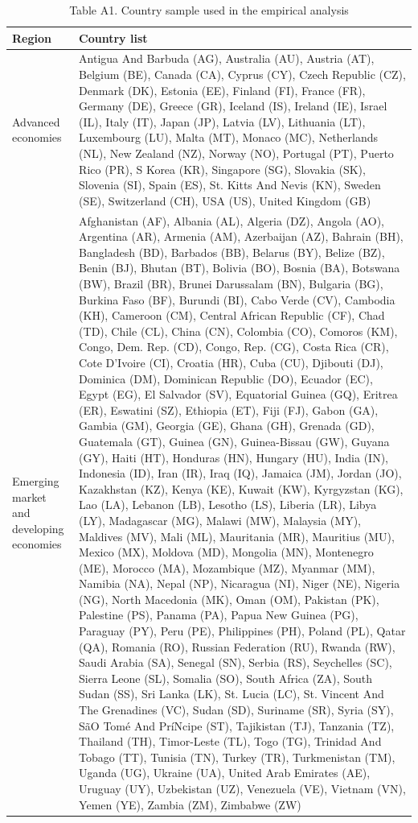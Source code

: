 \begin{table}[htbp]
\centering
\caption{Table A1. Country sample used in the empirical analysis}
\small
\begin{tabular}{p{}p{}}
\hline
Region & Country list \\
\hline
Advanced economies & Antigua And Barbuda (AG), Australia (AU), Austria (AT), Belgium (BE), Canada (CA), Cyprus (CY), Czech Republic (CZ), Denmark (DK), Estonia (EE), Finland (FI), France (FR), Germany (DE), Greece (GR), Iceland (IS), Ireland (IE), Israel (IL), Italy (IT), Japan (JP), Latvia (LV), Lithuania (LT), Luxembourg (LU), Malta (MT), Monaco (MC), Netherlands (NL), New Zealand (NZ), Norway (NO), Portugal (PT), Puerto Rico (PR), S Korea (KR), Singapore (SG), Slovakia (SK), Slovenia (SI), Spain (ES), St. Kitts And Nevis (KN), Sweden (SE), Switzerland (CH), USA (US), United Kingdom (GB) \\
Emerging market and developing economies & Afghanistan (AF), Albania (AL), Algeria (DZ), Angola (AO), Argentina (AR), Armenia (AM), Azerbaijan (AZ), Bahrain (BH), Bangladesh (BD), Barbados (BB), Belarus (BY), Belize (BZ), Benin (BJ), Bhutan (BT), Bolivia (BO), Bosnia (BA), Botswana (BW), Brazil (BR), Brunei Darussalam (BN), Bulgaria (BG), Burkina Faso (BF), Burundi (BI), Cabo Verde (CV), Cambodia (KH), Cameroon (CM), Central African Republic (CF), Chad (TD), Chile (CL), China (CN), Colombia (CO), Comoros (KM), Congo, Dem. Rep. (CD), Congo, Rep. (CG), Costa Rica (CR), Cote D'Ivoire (CI), Croatia (HR), Cuba (CU), Djibouti (DJ), Dominica (DM), Dominican Republic (DO), Ecuador (EC), Egypt (EG), El Salvador (SV), Equatorial Guinea (GQ), Eritrea (ER), Eswatini (SZ), Ethiopia (ET), Fiji (FJ), Gabon (GA), Gambia (GM), Georgia (GE), Ghana (GH), Grenada (GD), Guatemala (GT), Guinea (GN), Guinea-Bissau (GW), Guyana (GY), Haiti (HT), Honduras (HN), Hungary (HU), India (IN), Indonesia (ID), Iran (IR), Iraq (IQ), Jamaica (JM), Jordan (JO), Kazakhstan (KZ), Kenya (KE), Kuwait (KW), Kyrgyzstan (KG), Lao (LA), Lebanon (LB), Lesotho (LS), Liberia (LR), Libya (LY), Madagascar (MG), Malawi (MW), Malaysia (MY), Maldives (MV), Mali (ML), Mauritania (MR), Mauritius (MU), Mexico (MX), Moldova (MD), Mongolia (MN), Montenegro (ME), Morocco (MA), Mozambique (MZ), Myanmar (MM), Namibia (NA), Nepal (NP), Nicaragua (NI), Niger (NE), Nigeria (NG), North Macedonia (MK), Oman (OM), Pakistan (PK), Palestine (PS), Panama (PA), Papua New Guinea (PG), Paraguay (PY), Peru (PE), Philippines (PH), Poland (PL), Qatar (QA), Romania (RO), Russian Federation (RU), Rwanda (RW), Saudi Arabia (SA), Senegal (SN), Serbia (RS), Seychelles (SC), Sierra Leone (SL), Somalia (SO), South Africa (ZA), South Sudan (SS), Sri Lanka (LK), St. Lucia (LC), St. Vincent And The Grenadines (VC), Sudan (SD), Suriname (SR), Syria (SY), SãO Tomé And PríNcipe (ST), Tajikistan (TJ), Tanzania (TZ), Thailand (TH), Timor-Leste (TL), Togo (TG), Trinidad And Tobago (TT), Tunisia (TN), Turkey (TR), Turkmenistan (TM), Uganda (UG), Ukraine (UA), United Arab Emirates (AE), Uruguay (UY), Uzbekistan (UZ), Venezuela (VE), Vietnam (VN), Yemen (YE), Zambia (ZM), Zimbabwe (ZW) \\

\end{tabular}
\end{table}
